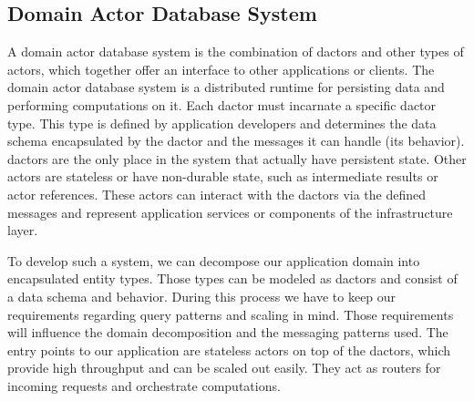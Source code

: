   \subsection{Domain Actor Database System}\label{sec:domain_actor_database}
    A domain actor database system is the combination of \glspl{dactor} and other types of actors, which together offer an interface to other applications or clients.
    The domain actor database system is a distributed runtime for persisting data and performing computations on it.
    Each \gls{dactor} must incarnate a specific \gls{dactor} type.
    This type is defined by application developers and determines the data schema encapsulated by the \gls{dactor} and the messages it can handle (its behavior).
    \Glspl{dactor} are the only place in the system that actually have persistent state.
    Other actors are stateless or have non-durable state, such as intermediate results or actor references.
    These actors can interact with the \glspl{dactor} via the defined messages and represent application services or components of the infrastructure layer.
    
    To develop such a system, we can decompose our application domain into encapsulated entity types.
    Those types can be modeled as \glspl{dactor} and consist of a data schema and behavior.
    During this process we have to keep our requirements regarding query patterns and scaling in mind.
    Those requirements will influence the domain decomposition and the messaging patterns used.
    The entry points to our application are stateless actors on top of the \glspl{dactor}, which provide high throughput and can be scaled out easily.
    They act as routers for incoming requests and orchestrate computations.
